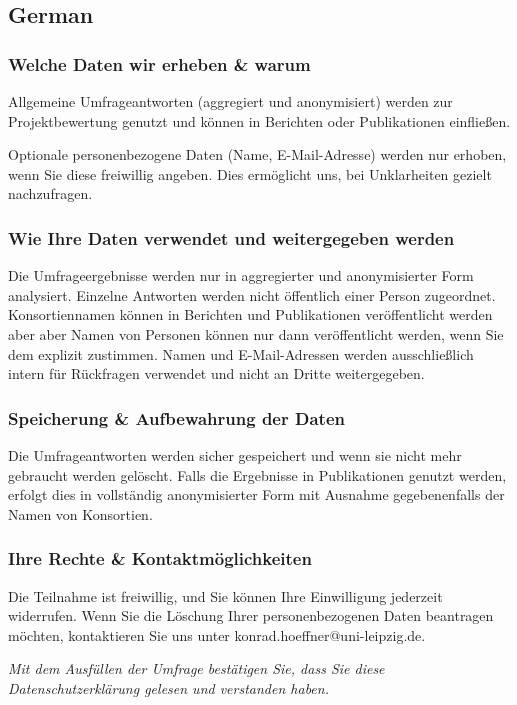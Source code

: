 \documentclass[headsepline,titlepage,twoside,12pt,toc=flat,headings=normal]{scrreprt}
\begin{document}
\subsection{German}

\subsubsection{Welche Daten wir erheben \& warum}\label{welche-daten-wir-erheben-warum}
Allgemeine Umfrageantworten (aggregiert und anonymisiert) werden zur Projektbewertung genutzt und können in Berichten oder Publikationen einfließen.

Optionale personenbezogene Daten (Name, E-Mail-Adresse) werden nur erhoben, wenn Sie diese freiwillig angeben.
Dies ermöglicht uns, bei Unklarheiten gezielt nachzufragen.
\subsubsection{Wie Ihre Daten verwendet und weitergegeben werden}
Die Umfrageergebnisse werden nur in aggregierter und anonymisierter Form analysiert.
Einzelne Antworten werden nicht öffentlich einer Person zugeordnet.
Konsortiennamen können in Berichten und Publikationen veröffentlicht werden aber aber Namen von Personen können nur dann veröffentlicht werden, wenn Sie dem explizit zustimmen.
Namen und E-Mail-Adressen werden ausschließlich intern für Rückfragen verwendet und nicht an Dritte weitergegeben.


\subsubsection{Speicherung \& Aufbewahrung der Daten}
Die Umfrageantworten werden sicher gespeichert und wenn sie nicht mehr gebraucht werden gelöscht.
Falls die Ergebnisse in Publikationen genutzt werden, erfolgt dies in vollständig anonymisierter Form mit Ausnahme gegebenenfalls der Namen von Konsortien.


\subsubsection{Ihre Rechte \& Kontaktmöglichkeiten}
Die Teilnahme ist freiwillig, und Sie können Ihre Einwilligung jederzeit widerrufen.
Wenn Sie die Löschung Ihrer personenbezogenen Daten beantragen möchten, kontaktieren Sie uns unter konrad.hoeffner@uni-leipzig.de.

\emph{Mit dem Ausfüllen der Umfrage bestätigen Sie, dass Sie diese Datenschutzerklärung gelesen und verstanden haben.}
\end{document}
